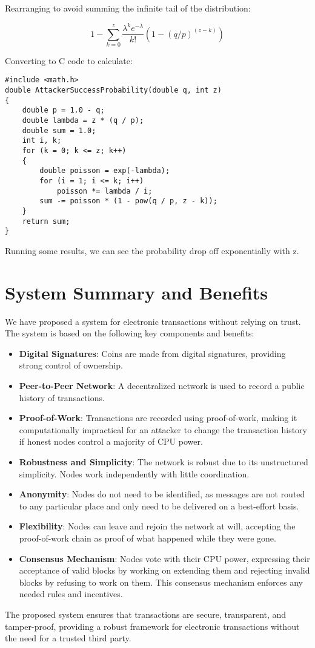 \documentclass{article}
\begin{document}
Rearranging to avoid summing the infinite tail of the distribution:

\begin{equation}
1 - \sum_{k=0}^{z} \frac{\lambda^k e^{-\lambda}}{k!} \left(1-(q/p)^{(z-k)}\right)
\end{equation}

Converting to C code to calculate:

\begin{verbatim}
#include <math.h>
double AttackerSuccessProbability(double q, int z)
{
    double p = 1.0 - q;
    double lambda = z * (q / p);
    double sum = 1.0;
    int i, k;
    for (k = 0; k <= z; k++)
    {
        double poisson = exp(-lambda);
        for (i = 1; i <= k; i++)
            poisson *= lambda / i;
        sum -= poisson * (1 - pow(q / p, z - k));
    }
    return sum;
}
\end{verbatim}

Running some results, we can see the probability drop off exponentially with z.

\section{System Summary and Benefits}

We have proposed a system for electronic transactions without relying on trust. The system is based on the following key components and benefits:

\begin{itemize}
    \item \textbf{Digital Signatures}: Coins are made from digital signatures, providing strong control of ownership.
    \item \textbf{Peer-to-Peer Network}: A decentralized network is used to record a public history of transactions.
    \item \textbf{Proof-of-Work}: Transactions are recorded using proof-of-work, making it computationally impractical for an attacker to change the transaction history if honest nodes control a majority of CPU power.
    \item \textbf{Robustness and Simplicity}: The network is robust due to its unstructured simplicity. Nodes work independently with little coordination.
    \item \textbf{Anonymity}: Nodes do not need to be identified, as messages are not routed to any particular place and only need to be delivered on a best-effort basis.
    \item \textbf{Flexibility}: Nodes can leave and rejoin the network at will, accepting the proof-of-work chain as proof of what happened while they were gone.
    \item \textbf{Consensus Mechanism}: Nodes vote with their CPU power, expressing their acceptance of valid blocks by working on extending them and rejecting invalid blocks by refusing to work on them. This consensus mechanism enforces any needed rules and incentives.
\end{itemize}

The proposed system ensures that transactions are secure, transparent, and tamper-proof, providing a robust framework for electronic transactions without the need for a trusted third party.
\end{document}

